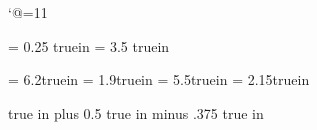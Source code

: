 %
%
%
%
%
\catcode`@=11                           %


\newdimen\headlineoffset        \headlineoffset = 0.25 truein
\newdimen\longindent            \longindent = 3.5 truein

\newdimen\hdimphone             \hdimphone = 6.2truein
\newdimen\vdimphone             \vdimphone = 1.9truein
\newdimen\hdimdate              \hdimdate = 5.5truein
\newdimen\vdimdate              \vdimdate = 2.15truein

\newskip\bigletterskip                  %
 true in plus 0.5 true in minus .375 true in

